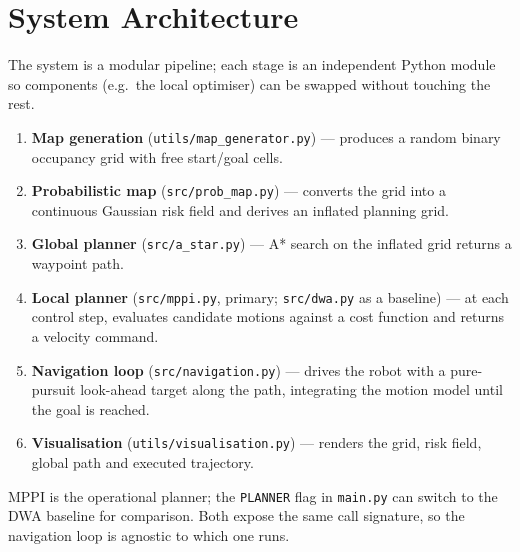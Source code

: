 \section{System Architecture}

The system is a modular pipeline; each stage is an independent Python module so components (e.g.\ the local optimiser) can be swapped without
touching the rest.

\begin{enumerate}
    \item \textbf{Map generation} (\texttt{utils/map\_generator.py}) --- produces a random
    binary occupancy grid with free start/goal cells.
    \item \textbf{Probabilistic map} (\texttt{src/prob\_map.py}) --- converts the grid into a
    continuous Gaussian risk field and derives an inflated planning grid.
    \item \textbf{Global planner} (\texttt{src/a\_star.py}) --- A* search on the inflated grid
    returns a waypoint path.
    \item \textbf{Local planner} (\texttt{src/mppi.py}, primary; \texttt{src/dwa.py} as a
    baseline) --- at each control step, evaluates candidate motions against a cost function
    and returns a velocity command.
    \item \textbf{Navigation loop} (\texttt{src/navigation.py}) --- drives the robot with a
    pure-pursuit look-ahead target along the path, integrating the motion model until the
    goal is reached.
    \item \textbf{Visualisation} (\texttt{utils/visualisation.py}) --- renders the grid, risk
    field, global path and executed trajectory.
\end{enumerate}

MPPI is the operational planner; the \texttt{PLANNER} flag in \texttt{main.py} can switch to
the DWA baseline for comparison. Both expose the same call signature, so the navigation loop
is agnostic to which one runs.
